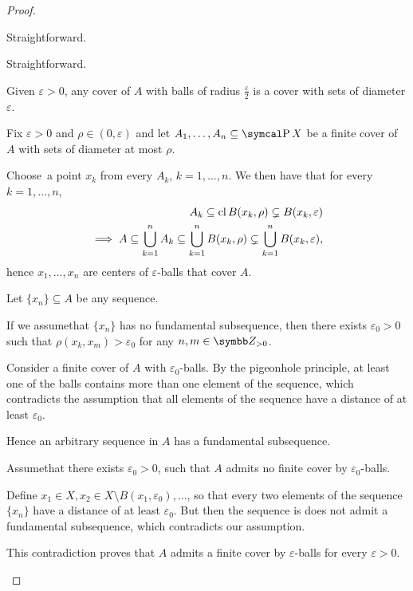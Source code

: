 \begin{proof}\mbox{}
  \begin{description}
     Straightforward.

     Straightforward.

     Given \( \varepsilon > 0 \), any cover of \( A \) with balls of radius \( \frac \varepsilon 2 \) is a cover with sets of diameter \( \varepsilon \).

     Fix \( \varepsilon > 0 \) and \( \rho \in (0, \varepsilon) \) and let \( A_1, \ldots, A_n \subseteq \Power X \) be a finite cover of \( A \) with sets of diameter at most \( \rho \).

    Choose\AOC~a point \( x_k \) from every \( A_k \), \( k = 1, \ldots, n \). We then have that for every \( k = 1, \ldots, n \),
    \begin{align*}
      A_k \subseteq \operatorname{cl} B(x_k, \rho) \subsetneq B(x_k, \varepsilon)
      \\
      \implies A \subseteq \bigcup_{k=1}^n A_k \subseteq \bigcup_{k=1}^n B(x_k, \rho) \subsetneq \bigcup_{k=1}^n B(x_k, \varepsilon),
    \end{align*}
    hence \( x_1, \ldots, x_n \) are centers of \( \varepsilon \)-balls that cover \( A \).

     Let \( \{ x_n \} \subseteq A \) be any sequence.

    If we assume\LEM that \( \{ x_n \} \) has no fundamental subsequence, then there exists \( \varepsilon_0 > 0 \) such that \( \rho(x_k, x_m) > \varepsilon_0 \) for any \( n, m \in \BZ_{>0} \).

    Consider a finite cover of \( A \) with \( \varepsilon_0 \)-balls. By the pigeonhole principle, at least one of the balls contains more than one element of the sequence, which contradicts the assumption that all elements of the sequence have a distance of at least \( \varepsilon_0 \).

    Hence an arbitrary sequence in \( A \) has a fundamental subsequence.

     Assume\LEM that there exists \( \varepsilon_0 > 0 \), such that \( A \) admits no finite cover by \( \varepsilon_0 \)-balls.

    Define \( x_1 \in X, x_2 \in X \setminus B(x_1, \varepsilon_0), \ldots \), so that every two elements of the sequence \( \{ x_n \} \) have a distance of at least \( \varepsilon_0 \). But then the sequence is does not admit a fundamental subsequence, which contradicts our assumption.

    This contradiction proves that \( A \) admits a finite cover by \( \varepsilon \)-balls for every \( \varepsilon > 0 \).
  \end{description}
\end{proof}

